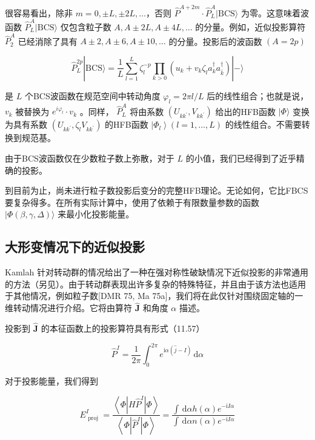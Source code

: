 很容易看出，除非 $m=0,\pm L,\pm2L,\ldots$，否则 $\widehat{P}^{A+2m}\cdot\widehat{P}^{A}_{L}|\mathrm{BCS}\rangle$
为零。这意味着波函数 $\widehat{P}^{A}_{L}|\mathrm{BCS}\rangle$ 仅包含粒子数 $A,A\pm2L,A\pm4L,\ldots$
的分量。例如，近似投影算符 ${\widehat{P}}^{A}_{2}$ 已经消除了具有 $A\pm2,A\pm6,A\pm{10},\ldots$
的分量。投影后的波函数 $\left({A={2p}}\right)$

\[
{\widehat{P}}^{2p}_{L}|\mathrm{BCS}\rangle=\frac{1}{L}\mathop{\sum}\limits^{L}_{l=1}\zeta^{-p}_{l}\mathop{\prod}\limits_{k>0}\left(u_{k}+v_{k}\zeta_{l}a^{\dagger}_{k}a^{\dagger}_{\bar{k}}\right)|-\rangle\tag{11.75}
\]

是 $L$ 个BCS波函数在规范空间中转动角度 ${\varphi}_{l}={2\pi l}/L$ 后的线性组合；也就是说，
${v}_{k}$ 被替换为 ${e}^{i{\varphi}_{l}}\cdot{v}_{k}$ 。同样， ${\widehat{P}}^{A}_{L}$
将由系数 $\left({{U}_{k{k}^{\prime}},{V}_{k{k}^{\prime}}}\right)$ 给出的HFB函数
$|\Phi\rangle$ 变换为具有系数 $\left({{U}_{k{k}^{\prime}},{\zeta}_{l}{V}_{k{k}^{\prime}}}\right)$
的HFB函数 $\left|{\Phi}_{l}\right\rangle \left({l=1,\ldots,L}\right)$
的线性组合。不需要转换到规范基。

由于BCS波函数仅在少数粒子数上弥散，对于 $L$ 的小值，我们已经得到了近乎精确的投影。

到目前为止，尚未进行粒子数投影后变分的完整HFB理论。无论如何，它比FBCS要复杂得多。在所有实际计算中，使用了依赖于有限数量参数的函数
$|\Phi\left({\beta,\gamma,\Delta}\right)\rangle$ 来最小化投影能量。

\subsection{大形变情况下的近似投影}

Kamlah \cite{Ka68}针对转动群的情况给出了一种在强对称性破缺情况下近似投影的非常通用的方法（另见\cite{Ku72}）。由于转动群表现出许多复杂的特殊特征，并且由于该方法也适用于其他情况，例如粒子数{[}DMR
75, Ma 75a{]}，我们将在此仅针对围绕固定轴的一维转动情况进行介绍。它将由算符 $\widehat{\boldsymbol{J}}$
和角度 $\alpha$ 描述。

投影到 $\widehat{\boldsymbol{J}}$ 的本征函数上的投影算符具有形式（11.57）

\[
{\widehat{P}}^{I}=\frac{1}{2\pi}{\int}^{2\pi}_{0}{e}^{{\mathrm{i}\alpha}\left({\widehat{j}-I}\right)}{\,\mathrm{d}\alpha}\tag{11.76}
\]

对于投影能量，我们得到

\[
{E}^{I}_{\text{ proj }}=\frac{\left\langle \Phi\left|H{\widehat{P}}^{I}\right|\Phi\right\rangle }{\left\langle \Phi\left|{\widehat{P}}^{I}\right|\Phi\right\rangle }=\frac{\int{\,\mathrm{d}\alpha h}\left(\alpha\right){e}^{-{\mathrm{i}I\alpha}}}{\int{\,\mathrm{d}\alpha n}\left(\alpha\right){e}^{-{\mathrm{i}I\alpha}}}\tag{11.77}
\]

